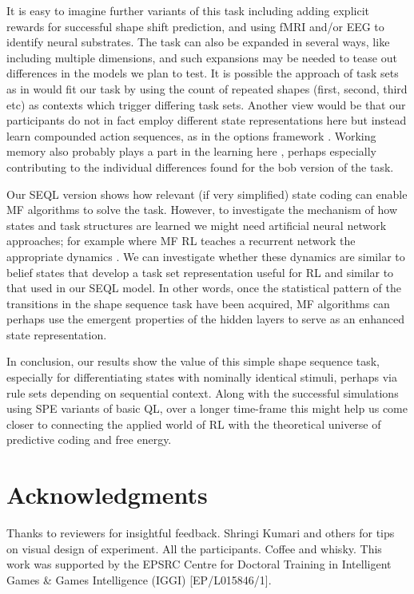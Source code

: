 \documentclass[10pt,letterpaper]{article}
\begin{document}
It is easy to imagine further variants of this task including adding explicit rewards for successful shape shift prediction, and using fMRI and/or EEG to identify neural substrates. The task can also be expanded in several ways, like including multiple dimensions, and such expansions may be needed to tease out differences in the models we plan to test. It is possible the approach of task sets as in \cite{Collins2013-cv} would fit our task by using the count of repeated shapes (first, second, third etc) as contexts which trigger differing task sets. Another view would be that our participants do not in fact employ different state representations here but instead learn compounded action sequences, as in the options framework \cite{Botvinick2009-bl}. Working memory also probably plays a part in the learning here \cite{Collins2012-kd}, perhaps especially contributing to the individual differences found for the bob version of the task.

Our SEQL version shows how relevant (if very simplified) state coding can enable MF algorithms to solve the task. However, to investigate the mechanism of how states and task structures are learned we might need artificial neural network approaches; for example where MF RL teaches a recurrent network the appropriate dynamics \cite{Botvinick2019-qf}. We can investigate whether these dynamics are similar to belief states \cite{Schuck2018-ik,Babayan2018-ix} that develop a task set representation \cite{Collins2013-cv} useful for RL and similar to that used in our SEQL model. In other words, once the statistical pattern of the transitions in the shape sequence task have been acquired, MF algorithms can perhaps use the emergent properties of the hidden layers to serve as an enhanced state representation.

In conclusion, our results show the value of this simple shape sequence task, especially for differentiating states with nominally identical stimuli, perhaps via rule sets depending on sequential context. Along with the successful simulations using SPE variants of basic QL, over a longer time-frame this might help us come closer to connecting the applied world of RL with the theoretical universe of predictive coding and free energy.


\section{Acknowledgments}

Thanks to reviewers for insightful feedback. Shringi Kumari and others for tips on visual design of experiment. All the participants. Coffee and whisky. This work was supported by the EPSRC Centre for Doctoral Training in Intelligent Games \& Games Intelligence (IGGI) [EP/L015846/1].





\setlength{\bibleftmargin}{.125in}
\setlength{\bibindent}{-\bibleftmargin}


\end{document}

